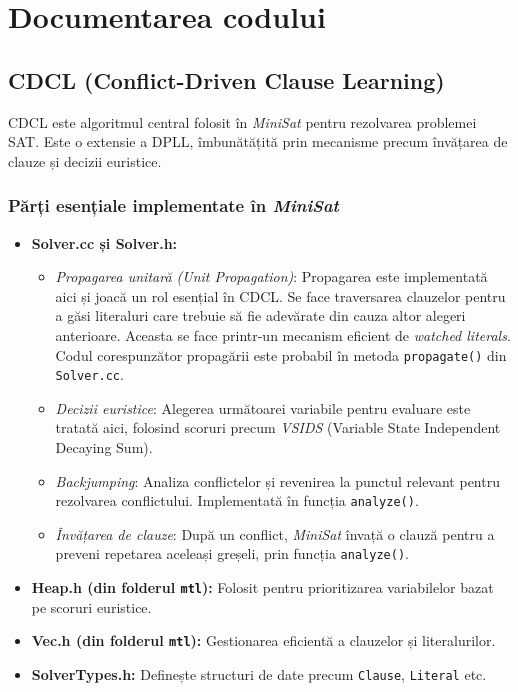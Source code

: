 \documentclass[12pt,a4paper]{report}
\begin{document}
 \cite{b5}


\chapter{Documentarea codului}

\section*{CDCL (Conflict-Driven Clause Learning)}
CDCL este algoritmul central folosit în \textit{MiniSat} pentru rezolvarea problemei SAT. Este o extensie a DPLL, îmbunătățită prin mecanisme precum învățarea de clauze și decizii euristice.

\subsection*{Părți esențiale implementate în \textit{MiniSat}}
\begin{itemize}
    \item \textbf{Solver.cc și Solver.h:}
    \begin{itemize}
        \item \textit{Propagarea unitară (Unit Propagation)}: Propagarea este implementată aici și joacă un rol esențial în CDCL. Se face traversarea clauzelor pentru a găsi literaluri care trebuie să fie adevărate din cauza altor alegeri anterioare. Aceasta se face printr-un mecanism eficient de \textit{watched literals}. Codul corespunzător propagării este probabil în metoda \texttt{propagate()} din \texttt{Solver.cc}.
        \item \textit{Decizii euristice}: Alegerea următoarei variabile pentru evaluare este tratată aici, folosind scoruri precum \textit{VSIDS} (Variable State Independent Decaying Sum).
        \item \textit{Backjumping}: Analiza conflictelor și revenirea la punctul relevant pentru rezolvarea conflictului. Implementată în funcția \texttt{analyze()}.
        \item \textit{Învățarea de clauze}: După un conflict, \textit{MiniSat} învață o clauză pentru a preveni repetarea aceleași greșeli, prin funcția \texttt{analyze()}.
    \end{itemize}
    \item \textbf{Heap.h (din folderul \texttt{mtl}):} Folosit pentru prioritizarea variabilelor bazat pe scoruri euristice.
    \item \textbf{Vec.h (din folderul \texttt{mtl}):} Gestionarea eficientă a clauzelor și literalurilor.
    \item \textbf{SolverTypes.h:} Definește structuri de date precum \texttt{Clause}, \texttt{Literal} etc.
\end{itemize}
\end{document}

